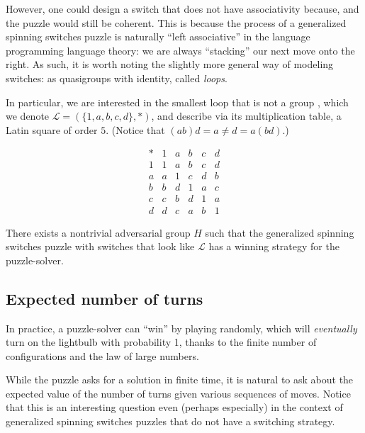 However, one could design a switch that does not have associativity
because, and the puzzle would still be coherent. This is because the process of
a generalized spinning switches puzzle is naturally
``left associative'' in the language programming language theory:
we are always ``stacking'' our next move onto the right.
As such, it is worth noting the slightly more general way of modeling switches:
as quasigroups with identity, called \textit{loops}.

In particular, we are interested in the smallest loop that is not a group
\cite{MSELoop}, which we denote
$\mathcal{L} = (\{1, a, b, c, d\}, \ast)$,
and describe via its multiplication table, a Latin square of order $5$.
(Notice that $(ab)d = a \neq d = a(bd)$.)
\begin{singlespace}
\[
  \begin{array}{c|ccccc}
    \ast & 1 & a & b & c & d \\
    \hline
      1 & 1 & a & b & c & d \\
      a & a & 1 & c & d & b \\
      b & b & d & 1 & a & c \\
      c & c & b & d & 1 & a \\
      d & d & c & a & b & 1
  \end{array}
\]
\end{singlespace}

\begin{conjecture}
  There exists a nontrivial adversarial group $H$ such that the generalized
  spinning switches puzzle with switches that look like $\mathcal{L}$ has
  a winning strategy for the puzzle-solver.
\end{conjecture}

\subsection{Expected number of turns}
In practice, a puzzle-solver can ``win'' by playing randomly,
which will \textit{eventually} turn on the lightbulb with probability 1,
thanks to the finite number of configurations and the law of large numbers.

While the puzzle asks for a solution in finite time,
it is natural to ask about the expected value of the number of turns given
various sequences of moves.
Notice that this is an interesting question even (perhaps especially)
in the context of generalized spinning switches puzzles that do not have a
switching strategy.

